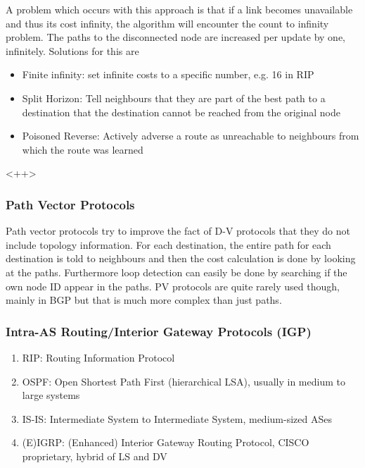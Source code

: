 A problem which occurs with this approach is that if a link becomes unavailable and thus its cost infinity, the algorithm will encounter the count to infinity problem.
The paths to the disconnected node are increased per update by one, infinitely.
Solutions for this are
\begin{itemize}
  \item Finite infinity: set infinite costs to a specific number, e.g. 16 in RIP
  \item Split Horizon: Tell neighbours that they are part of the best path to a destination that the destination cannot be reached from the original node
  \item Poisoned Reverse: Actively adverse a route as unreachable to neighbours from which the route was learned
\end{itemize}<++>

\subsubsection*{Path Vector Protocols}
Path vector protocols try to improve the fact of D-V protocols that they do not include topology information.
For each destination, the entire path for each destination is told to neighbours and then the cost calculation is done by looking at the paths.
Furthermore loop detection can easily be done by searching if the own node ID appear in the paths.
PV protocols are quite rarely used though, mainly in BGP but that is much more complex than just paths.

\subsubsection*{Intra-AS Routing/Interior Gateway Protocols (IGP)}
\begin{enumerate}
  \item RIP: Routing Information Protocol
  \item OSPF: Open Shortest Path First (hierarchical LSA), usually in medium to large systems
  \item IS-IS: Intermediate System to Intermediate System, medium-sized ASes
  \item (E)IGRP: (Enhanced) Interior Gateway Routing Protocol, CISCO proprietary, hybrid of LS and DV
\end{enumerate}
\vspace{5pt}

